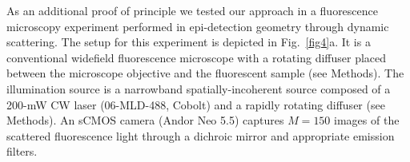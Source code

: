 \documentclass[pdflatex,sn-mathphys-num]{sn-jnl}%
\theoremstyle{thmstyleone}%
\theoremstyle{thmstyletwo}%
\theoremstyle{thmstylethree}%
\begin{document}
As an additional proof of principle we tested our approach in a fluorescence microscopy experiment performed in epi-detection geometry through dynamic scattering. %
The setup for this experiment is depicted in Fig.~\ref{fig4}a. It is a conventional widefield fluorescence microscope with a rotating diffuser placed between the microscope objective and the fluorescent sample (see Methods). The illumination source is a narrowband spatially-incoherent source composed of a 200-mW CW laser (06-MLD-488, Cobolt) and a rapidly rotating diffuser (see Methods). 
An sCMOS camera (Andor Neo 5.5) captures $M=150$ images of the scattered fluorescence light through a dichroic mirror and appropriate emission filters. %

\end{document}
